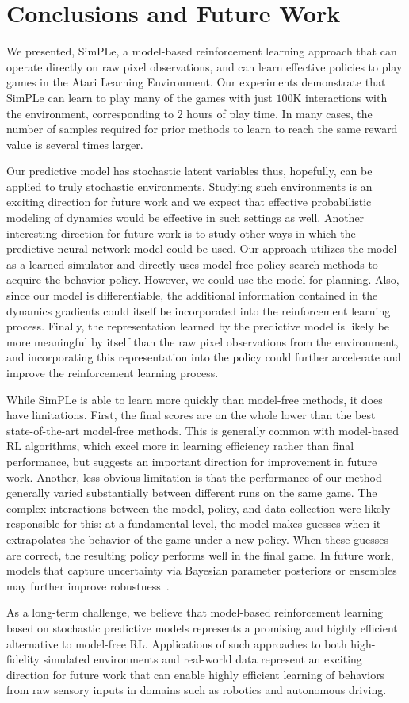 \section{Conclusions and Future Work}

We presented, SimPLe, a model-based reinforcement learning approach that can operate directly on raw pixel observations, and can learn effective policies to play games in the Atari Learning Environment. Our experiments demonstrate that SimPLe can learn to play many of the games with just $100$K interactions with the environment, corresponding to 2 hours of play time. In many cases, the number of samples required for prior methods to learn to reach the same reward value is several times larger.

Our predictive model has stochastic latent variables thus, hopefully, can be applied to truly stochastic environments. Studying such environments is an exciting direction for future work and we expect that effective probabilistic modeling of dynamics would be effective in such settings as well. Another interesting direction for future work is to study other ways in which the predictive neural network model could be used. Our approach utilizes the model as a learned simulator and directly uses model-free policy search methods to acquire the behavior policy. However, we could use the model for planning. Also, since our model is differentiable, the additional information contained in the dynamics gradients could itself be incorporated into the reinforcement learning process. Finally, the representation learned by the predictive model is likely be more meaningful by itself than the raw pixel observations from the environment, and incorporating this representation into the policy could further accelerate and improve the reinforcement learning process.

While SimPLe is able to learn more quickly than model-free methods, it does have limitations. First, the final scores are on the whole lower than the best state-of-the-art model-free methods. This is generally common with model-based RL algorithms, which excel more in learning efficiency rather than final performance, but suggests an important direction for improvement in future work. Another, less obvious limitation is that the performance of our method generally varied substantially between different runs on the same game. The complex interactions between the model, policy, and data collection were likely responsible for this: at a fundamental level, the model makes guesses when it extrapolates the behavior of the game under a new policy. When these guesses are correct, the resulting policy performs well in the final game. In future work, models that capture uncertainty via Bayesian parameter posteriors or ensembles may further improve robustness~\cite{trpo_ensemble, Chua18}.

As a long-term challenge, we believe that model-based reinforcement learning based on stochastic predictive models represents a promising and highly efficient alternative to model-free RL. Applications of such approaches to both high-fidelity simulated environments and real-world data represent an exciting direction for future work that can enable highly efficient learning of behaviors from raw sensory inputs in domains such as robotics and autonomous driving.
